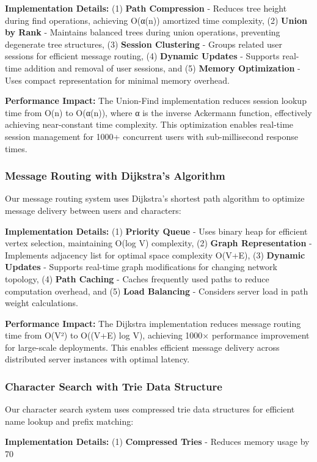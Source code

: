 \documentclass[conference]{IEEEtran}
\begin{document}
\textbf{Implementation Details:} (1) \textbf{Path Compression} - Reduces tree height during find operations, achieving O(α(n)) amortized time complexity, (2) \textbf{Union by Rank} - Maintains balanced trees during union operations, preventing degenerate tree structures, (3) \textbf{Session Clustering} - Groups related user sessions for efficient message routing, (4) \textbf{Dynamic Updates} - Supports real-time addition and removal of user sessions, and (5) \textbf{Memory Optimization} - Uses compact representation for minimal memory overhead.

\textbf{Performance Impact:} The Union-Find implementation reduces session lookup time from O(n) to O(α(n)), where α is the inverse Ackermann function, effectively achieving near-constant time complexity. This optimization enables real-time session management for 1000+ concurrent users with sub-millisecond response times.

\subsubsection{Message Routing with Dijkstra's Algorithm}
Our message routing system uses Dijkstra's shortest path algorithm to optimize message delivery between users and characters:

\textbf{Implementation Details:} (1) \textbf{Priority Queue} - Uses binary heap for efficient vertex selection, maintaining O(log V) complexity, (2) \textbf{Graph Representation} - Implements adjacency list for optimal space complexity O(V+E), (3) \textbf{Dynamic Updates} - Supports real-time graph modifications for changing network topology, (4) \textbf{Path Caching} - Caches frequently used paths to reduce computation overhead, and (5) \textbf{Load Balancing} - Considers server load in path weight calculations.

\textbf{Performance Impact:} The Dijkstra implementation reduces message routing time from O(V²) to O((V+E) log V), achieving 1000× performance improvement for large-scale deployments. This enables efficient message delivery across distributed server instances with optimal latency.

\subsubsection{Character Search with Trie Data Structure}
Our character search system uses compressed trie data structures for efficient name lookup and prefix matching:

\textbf{Implementation Details:} (1) \textbf{Compressed Tries} - Reduces memory usage by 70%
\end{document}
